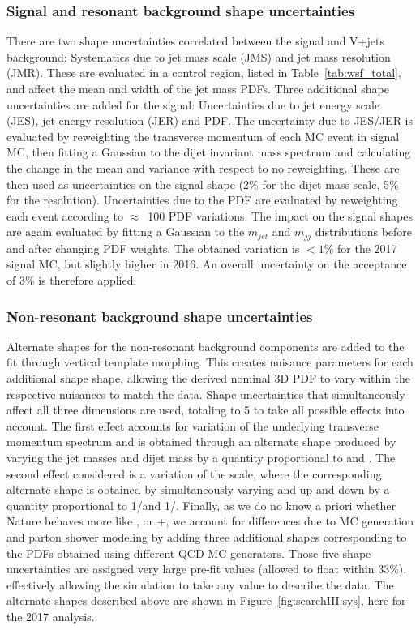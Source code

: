 \subsubsection{Signal and resonant background shape uncertainties}
There are two shape uncertainties correlated between the signal and V+jets background: Systematics due to jet mass scale (JMS) and jet mass resolution (JMR). These are evaluated in a \ttbar control region, listed in Table~\ref{tab:wsf_total}, and affect the mean and width of the jet mass PDFs. 
Three additional shape uncertainties are added for the signal: Uncertainties due to jet energy scale (JES), jet energy resolution (JER) and PDF. The uncertainty due to JES/JER is evaluated by reweighting the transverse momentum of each MC event in signal MC, then fitting a Gaussian to the dijet invariant mass spectrum and calculating the change in the mean and variance with respect to no reweighting. These are then used as uncertainties on the signal \MVV shape (2\% for the dijet mass scale, 5\% for the resolution).\newline
Uncertainties due to the PDF are evaluated by reweighting each event according to $\approx$~100 PDF variations. The impact on the signal shapes are again evaluated by fitting a Gaussian to the $m_{jet}$ and $m_{jj}$ distributions before and after changing PDF weights. The obtained variation is $<1\%$ for the 2017 signal MC, but slightly higher in 2016. An overall uncertainty on the acceptance of 3\% is therefore applied. 


\subsubsection{Non-resonant background shape uncertainties}
Alternate shapes for the non-resonant background components are added to the fit through vertical template morphing. This creates nuisance parameters for each additional shape shape, allowing the derived nominal 3D PDF to vary within the respective nuisances to match the data. Shape uncertainties that simultaneously affect all three dimensions are used, totaling to 5 to take all possible effects into account. The first effect accounts for variation of the underlying transverse momentum spectrum and is obtained through an alternate shape produced by varying the jet masses \MJ and dijet mass \MVV by a quantity proportional to \MVV and \MJ. The second effect considered is a variation of the scale, where the corresponding alternate shape is obtained by simultaneously varying \MJ and \MVV up and down by a quantity proportional to 1/\MVV and 1/\MJ.
Finally, as we do no know a priori whether Nature behaves more like , \HERWIG{++} or \MADGRAPH{}+, we account for differences due to MC generation and parton shower modeling by adding three additional shapes corresponding to the PDFs obtained using different QCD MC generators.\newline
Those five shape uncertainties are assigned very large pre-fit values (allowed to float within 33\%), effectively allowing the simulation to take any value to describe the data. The alternate shapes described above are shown in Figure~\ref{fig:searchIII:sys}, here for the 2017 analysis.

